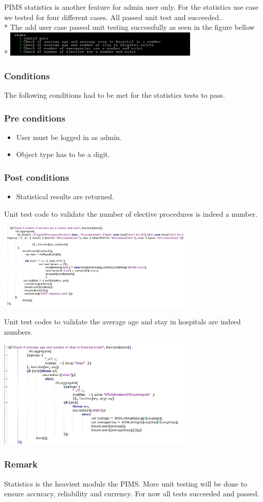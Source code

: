 PIMS statistics is another feature for admin user only. For the statistics use case we tested for four different cases. All passed unit test and succeeded..
\\* 
The add user case passed unit testing successfully as seen in the figure bellow
\\* 
\includegraphics[width=350px]{./TestingDoc/Graphics/statsResults}
		
\subsubsection*{Conditions}
The following conditions had to be met for the statistics tests to pass.
	
\subsubsection*{Pre conditions}	
\begin{itemize}
		\item User must be logged in as admin.
		\item Object type has to be a digit.
\end{itemize}	

\subsubsection*{Post conditions}	
\begin{itemize}
		\item Statistical results are returned.
\end{itemize}	

Unit test code to validate the number of elective procedures is indeed a number.	

\includegraphics[width=350px]{./TestingDoc/Graphics/StatsChecknumexists}

Unit test codes to validate the average age and stay in hospitals are indeed numbers.	

\includegraphics[width=350px]{./TestingDoc/Graphics/averageNumberStats}

\subsubsection*{Remark}
Statistics is the heaviest module the PIMS. More unit testing will be done to ensure accuracy, reliability and currency. For now all tests succeeded and passed.